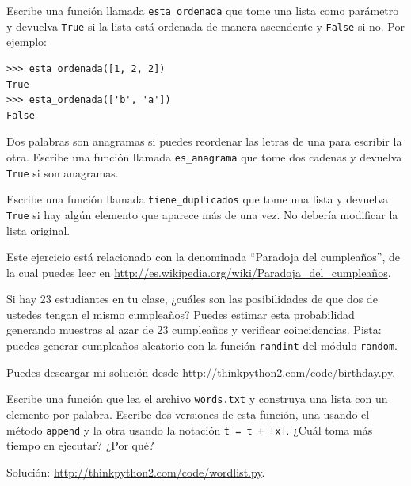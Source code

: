 \documentclass[10pt]{book}
\begin{document}
\begin{exercise}
Escribe una función llamada \verb"esta_ordenada" que tome una lista como
parámetro y devuelva {\tt True} si la lista está ordenada de manera
ascendente y {\tt False} si no.  Por ejemplo:

\begin{verbatim}
>>> esta_ordenada([1, 2, 2])
True
>>> esta_ordenada(['b', 'a'])
False
\end{verbatim}

\end{exercise}


\begin{exercise}
\label{anagram}

Dos palabras son anagramas si puedes reordenar las letras de una
para escribir la otra.  Escribe una función llamada \verb"es_anagrama"
que tome dos cadenas y devuelva {\tt True} si son anagramas.
\end{exercise}



\begin{exercise}
\label{duplicate}

Escribe una función llamada \verb"tiene_duplicados" que tome
una lista y devuelva {\tt True} si hay algún elemento que
aparece más de una vez.  No debería modificar la lista
original.

\end{exercise}


\begin{exercise}

Este ejercicio está relacionado con la denominada ``Paradoja del cumpleaños'', de la cual
puedes leer en \url{http://es.wikipedia.org/wiki/Paradoja_del_cumpleaños}.

Si hay 23 estudiantes en tu clase, ¿cuáles son las posibilidades
de que dos de ustedes tengan el mismo cumpleaños?  Puedes estimar esta
probabilidad generando muestras al azar de 23 cumpleaños
y verificar coincidencias.  Pista: puedes generar cumpleaños aleatorio
con la función {\tt randint} del módulo {\tt random}.

Puedes descargar mi
solución desde \url{http://thinkpython2.com/code/birthday.py}.

\end{exercise}



\begin{exercise}

Escribe una función que lea el archivo {\tt words.txt} y construya
una lista con un elemento por palabra.  Escribe dos versiones de
esta función, una usando el método {\tt append} y la
otra usando la notación {\tt t = t + [x]}.  ¿Cuál toma más
tiempo en ejecutar?  ¿Por qué?

Solución: \url{http://thinkpython2.com/code/wordlist.py}.

\end{exercise}
\end{document}
